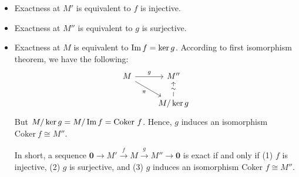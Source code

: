 \begin{itemize}
    \item Exactness at \(M'\) is equivalent to \(f\) is injective.
    \item  Exactness at \(M''\) is equivalent to \(g\) is surjective.
    \item Exactness at \(M\) is equivalent to \(\operatorname{Im} f  = \ker g\). According to first isomorphism theorem, we have the following:
\[\begin{tikzcd}
	M & {M''} \\
	& {M/\ker g}
	\arrow["g", from=1-1, to=1-2]
	\arrow["\pi"', from=1-1, to=2-2]
	\arrow["\sim"{description}, from=2-2, to=1-2]
\end{tikzcd}\]
But \(M/\ker g = M/\operatorname{Im} f = \text{Coker} \ f\). Hence, \(g\) induces an isomorphism \(\text{Coker}  \ f \cong M''\).

In short, a sequence \(\mathbf{0} \rightarrow M' \xrightarrow{f}M \xrightarrow{g} M'' \rightarrow \textbf{0}\) is exact if and only if (1) \(f\) is injective, (2) \(g\) is surjective, and (3) \(g\) induces an isomorphism Coker \(f \cong M''\).
\end{itemize}


